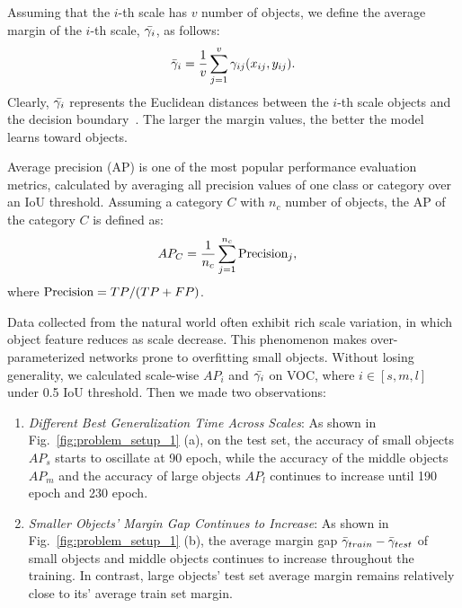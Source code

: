 \documentclass{article}
\begin{document}
Assuming that the $i$-th scale has $v$ number of objects, we define the average margin of the $i$-th scale, $\Bar{\gamma_i}$, as follows:  
\begin{align}
\label{avg_magn}
\Bar{\gamma}_i  = \frac{1}{v} \sum_{j= 1}^v \gamma_{ij}(x_{ij},y_{ij}).
\end{align}
Clearly, $\Bar{\gamma_i}$ represents the Euclidean distances between the $i$-th scale objects and the decision boundary~\cite{liu2016large}.
The larger the margin values, the better the model learns toward objects.

Average precision (AP) is one of the most popular performance evaluation metrics, calculated by averaging all precision values of one class or category over an IoU threshold. Assuming a category $C$ with $n_{c}$ number of objects, the AP of the category $C$ is defined as: %
\begin{equation}
\label{avg_precision}
\centering
\begin{split}
AP_{C} & = \frac{1}{n_{c}} \sum_{j= 1}^{n_{c}} \textnormal{Precision}_{j}, 
\end{split}
\end{equation}
where $\textnormal{Precision} = {TP}/({TP+FP})$.

Data collected from the natural world often exhibit rich scale variation, in which object feature reduces as scale decrease. 
This phenomenon makes over-parameterized networks prone to overfitting small objects.
Without losing generality, we calculated scale-wise $AP_{i}$ and $\Bar{\gamma_{i}}$ on VOC, where $i \in [s, m, l]$ under 0.5 IoU threshold. Then we made two observations:
%
\begin{enumerate}
    \item \textit{Different Best Generalization Time Across Scales}:
    As shown in Fig.~\ref{fig:problem_setup_1} (a), on the test set, the accuracy of small objects $AP_{s}$ starts to oscillate at 90 epoch, while the accuracy of the middle objects $AP_{m}$ and the accuracy of large objects $AP_{l}$ continues to increase until 190 epoch and 230 epoch. 
    \item \textit{Smaller Objects' Margin Gap Continues to Increase}:
    As shown in Fig.~\ref{fig:problem_setup_1} (b), the average margin gap $\Bar{\gamma}_{train} - \Bar{\gamma}_{test}$ of small objects and middle objects continues to increase throughout the training. In contrast, large objects' test set average margin remains relatively close to its' average train set margin. 
\end{enumerate}
\end{document}
